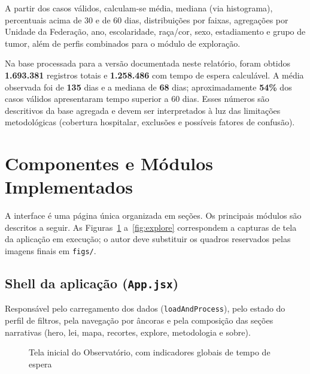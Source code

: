 A partir dos casos válidos, calculam-se média, mediana (via histograma), percentuais acima de 30 e de 60 dias, distribuições por faixas, agregações por Unidade da Federação, ano, escolaridade, raça/cor, sexo, estadiamento e grupo de tumor, além de perfis combinados para o módulo de exploração.

Na base processada para a versão documentada neste relatório, foram obtidos \textbf{1.693.381} registros totais e \textbf{1.258.486} com tempo de espera calculável. A média observada foi de \textbf{135} dias e a mediana de \textbf{68} dias; aproximadamente \textbf{54\%} dos casos válidos apresentaram tempo superior a 60 dias. Esses números são descritivos da base agregada e devem ser interpretados à luz das limitações metodológicas (cobertura hospitalar, exclusões e possíveis fatores de confusão).

\section{Componentes e Módulos Implementados}

A interface é uma página única organizada em seções. Os principais módulos são descritos a seguir. As Figuras~\ref{fig:hero} a~\ref{fig:explore} correspondem a capturas de tela da aplicação em execução; o autor deve substituir os quadros reservados pelas imagens finais em \texttt{figs/}.

\subsection{Shell da aplicação (\texttt{App.jsx})}

Responsável pelo carregamento dos dados (\texttt{loadAndProcess}), pelo estado do perfil de filtros, pela navegação por âncoras e pela composição das seções narrativas (hero, lei, mapa, recortes, explore, metodologia e sobre).

\begin{figure}[H]
\centering
\caption{Tela inicial do Observatório, com indicadores globais de tempo de espera}
\label{fig:hero}
\end{figure}

